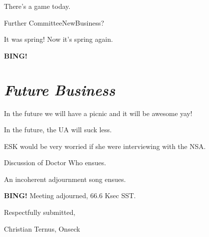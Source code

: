 \documentclass[10pt]{article}
\newcommand{\bing}{{\bf BING!} }
\newcommand{\goto}[1]{\bing \vskip 12pt \section*{{\em{#1}}}}
\begin{document}
There's a game today.

Further CommitteeNewBusiness?

It was spring!  Now it's spring again.             

\goto{Future Business}

In the future we will have a picnic and it will be awesome yay!

In the future, the UA will suck less.

ESK would be very worried if she were interviewing with the NSA.

Discussion of Doctor Who ensues.

An incoherent adjournment song ensues.

\bing
\noindent
Meeting adjourned, 66.6 Ksec SST.

\vspace{18pt}

\centerline{Respectfully submitted,}
\centerline{Christian Ternus, Onseck}
\end{document}
